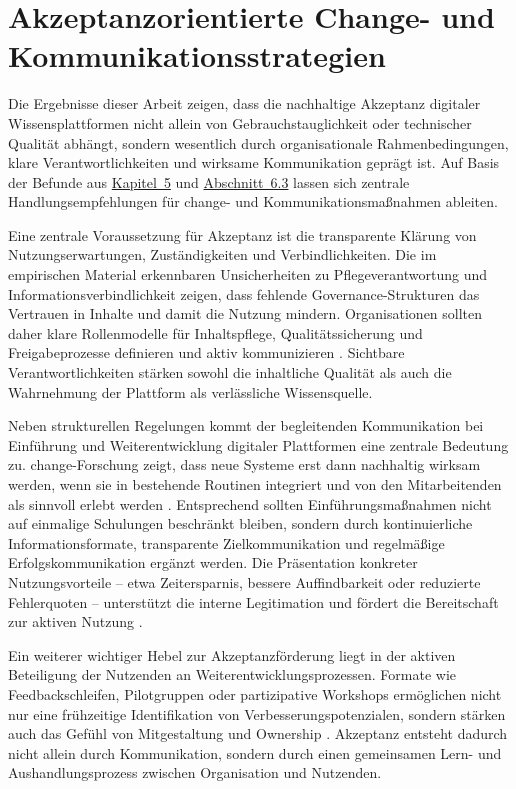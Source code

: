 \section{Akzeptanzorientierte Change- und Kommunikationsstrategien}
\label{sec:07-03_change-and-communication}

Die Ergebnisse dieser Arbeit zeigen, dass die nachhaltige Akzeptanz digitaler Wissensplattformen nicht allein von Gebrauchstauglichkeit oder technischer Qualität abhängt, sondern wesentlich durch organisationale Rahmenbedingungen, klare Verantwortlichkeiten und wirksame Kommunikation geprägt ist. Auf Basis der Befunde aus \hyperref[ch:05_analysis-and-results]{Kapitel~5} und \hyperref[sec:06-03_organizational-ux-implications]{Abschnitt~6.3} lassen sich zentrale Handlungsempfehlungen für \Gls{change}- und Kommunikationsmaßnahmen ableiten.

Eine zentrale Voraussetzung für Akzeptanz ist die transparente Klärung von Nutzungserwartungen, Zuständigkeiten und Verbindlichkeiten. Die im empirischen Material erkennbaren Unsicherheiten zu Pflegeverantwortung und Informationsverbindlichkeit zeigen, dass fehlende Governance-Strukturen das Vertrauen in Inhalte und damit die Nutzung mindern. Organisationen sollten daher klare Rollenmodelle für Inhaltspflege, Qualitätssicherung und Freigabeprozesse definieren und aktiv kommunizieren \cite{115:NNGContentManagement,309:NNGContentGovernance}. Sichtbare Verantwortlichkeiten stärken sowohl die inhaltliche Qualität als auch die Wahrnehmung der Plattform als verlässliche Wissensquelle.

Neben strukturellen Regelungen kommt der begleitenden Kommunikation bei Einführung und Weiterentwicklung digitaler Plattformen eine zentrale Bedeutung zu. \Gls{change}-Forschung zeigt, dass neue Systeme erst dann nachhaltig wirksam werden, wenn sie in bestehende Routinen integriert und von den Mitarbeitenden als sinnvoll erlebt werden \cite{110:Lewin1947,418:Kotter2012}. Entsprechend sollten Einführungsmaßnahmen nicht auf einmalige Schulungen beschränkt bleiben, sondern durch kontinuierliche Informationsformate, transparente Zielkommunikation und regelmäßige Erfolgskommunikation ergänzt werden. Die Präsentation konkreter Nutzungsvorteile -- etwa Zeitersparnis, bessere Auffindbarkeit oder reduzierte Fehlerquoten -- unterstützt die interne Legitimation und fördert die Bereitschaft zur aktiven Nutzung \cite{114:IntranetAdoption,301:Infragistics2015}.

Ein weiterer wichtiger Hebel zur Akzeptanzförderung liegt in der aktiven Beteiligung der Nutzenden an Weiterentwicklungsprozessen. Formate wie Feedbackschleifen, Pilotgruppen oder partizipative Workshops ermöglichen nicht nur eine frühzeitige Identifikation von Verbesserungspotenzialen, sondern stärken auch das Gefühl von Mitgestaltung und Ownership \cite{118:NNGUserInvolvement}. Akzeptanz entsteht dadurch nicht allein durch Kommunikation, sondern durch einen gemeinsamen Lern- und Aushandlungsprozess zwischen Organisation und Nutzenden.

